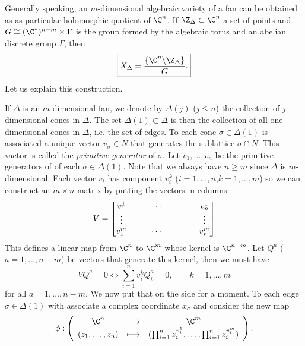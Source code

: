 \documentclass{worksheetclass}
\begin{document}
        Generally speaking, an $m$-dimensional algebraic variety of a fan can be obtained as as particular holomorphic quotient of $\C^n$. If $\Z_\Delta\subset\C^n$ a set of points and $G\cong (\C^*)^{n-m}\times\Gamma$ is the group formed by the algebraic torus and an abelian discrete group $\Gamma$, then
        \begin{equation}
            \boxed{X_\Delta=\frac{\{\C^n\backslash\Z_\Delta\}}{G}.}\label{eq:toricvargenform}
        \end{equation}
        Let us explain this construction.
        
        If $\Delta$ is an $m$-dimensional fan, we denote by $\Delta(j)$ ($j\leq n$) the collection of $j$-dimensional cones in $\Delta$. The set $\Delta(1)\subset\Delta$ is then the collection of all one-dimensional cones in $\Delta$, i.e. the set of edges. To each cone $\sigma\in\Delta(1)$ is associated a unique vector $v_\sigma\in N$ that generates the sublattice $\sigma\cap N$. This vactor is called the \emph{primitive generator} of $\sigma$. Let $v_1,\dots,v_n$ be the primitive generators of of each $\sigma\in\Delta(1)$. Note that we always have $n\geq m$ since $\Delta$ is $m$-dimensional. Each vector $v_i$ has component $v^k_i$ ($i=1,\dots,n$,$k=1,\dots,m$) so we can construct an $m\times n$ matrix by putting the vectors in columns:
        \begin{equation}
            V=
            \begin{bmatrix}
                v^1_1 & & & \cdots & \hspace{0.5cm} & & v^1_n \\
                \vdots & & & & & & \vdots \\
                v^m_1 & & & \cdots & & & v^m_n
            \end{bmatrix}
        \end{equation}
        This defines a linear map from $\C^n$ to $\C^m$ whose kernel is $\C^{n-m}$. Let $Q^a$ ($a=1,\dots,n-m$) be vectors that generate this kernel, then we must have
        \begin{equation}
            VQ^a=0\Leftrightarrow \sum^n_{i=1}v^k_i Q^a_i=0,\qquad k=1,\dots,m\label{eq:detQalpha}
        \end{equation}
        for all $a=1,\dots,n-m$. We now put that on the side for a moment. To each edge $\sigma\in\Delta(1)$ with associate a complex coordinate $x_\sigma$
        and consider the new map
        \begin{equation}
            \phi:\left(
            \begin{array}{ccc}
                \C^n & \longrightarrow & \C^m \\
                (z_1,\dots,z_n) & \longmapsto & (\prod^n_{i=1}z^{v^1_i}_i,\dots,\prod^n_{i=1}z^{v^m_i}_i)
            \end{array}
            \right).
        \end{equation}
\end{document}
